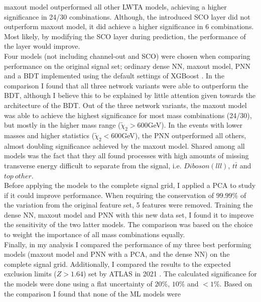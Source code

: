 maxout model outperformed all other \ac{LWTA} models, achieving a higher significance in 24/30 combinations. Although, the introduced \ac{SCO} layer did not outperform maxout model, it did achieve a higher significance in 6 
combinations. Most likely, by modifying the \ac{SCO} layer during prediction, the performance of the layer would improve.
\\\newline
Four models (not including channel-out and \ac{SCO}) were chosen when comparing performance on the original signal set; ordinary dense \ac{NN}, maxout model, \ac{PNN} and a \ac{BDT} implemented using the default settings of XGBoost \cite{XGB}. In the comparison I found that 
all three network variants were able to outperform the \ac{BDT}, although I believe this to be explained by little attention given towards the architecture of the \ac{BDT}. Out of the three network variants, the maxout model was able to achieve 
the highest significance for most mass combinations (24/30), but mostly in the higher mass range ($\tilde{\chi}_2>600$GeV). In the events with lower masses and higher statistics ($\tilde{\chi}_2<600$GeV), the \ac{PNN} outperformed all others, 
almost doubling significance achieved by the maxout model. Shared among all models was the fact that they all found processes with high amounts of missing transverse energy difficult to separate from the signal, i.e. $Diboson(lll)$, $t\bar{t}$ and $top\ other$.
\\\newline
Before applying the models to the complete signal grid, I applied a \ac{PCA} to study if it could improve performance. When requiring the conservation of $99.99\%$ of the variation from the original feature set, 5 features were removed.
Training the dense \ac{NN}, maxout model and \ac{PNN} with this new data set, I found it to improve the sensitivity of the two latter models. The comparison was based on the choice to weight the importance of all mass combinations equally.
\\\newline
Finally, in my analysis I compared the performance of my three best performing models (maxout model and \ac{PNN} with a \ac{PCA}, and the dense \ac{NN}) on the complete signal grid. Additionally, I compared the results to the expected exclusion 
limits ($Z>1.64$) set by \ac{ATLAS} in 2021 \cite{atlas_search_2021}. The calculated significance for the models were done using a flat uncertainty of $20\%$, $10\%$ and $<1\%$. Based on the comparison I found that none of the \ac{ML} models were 
